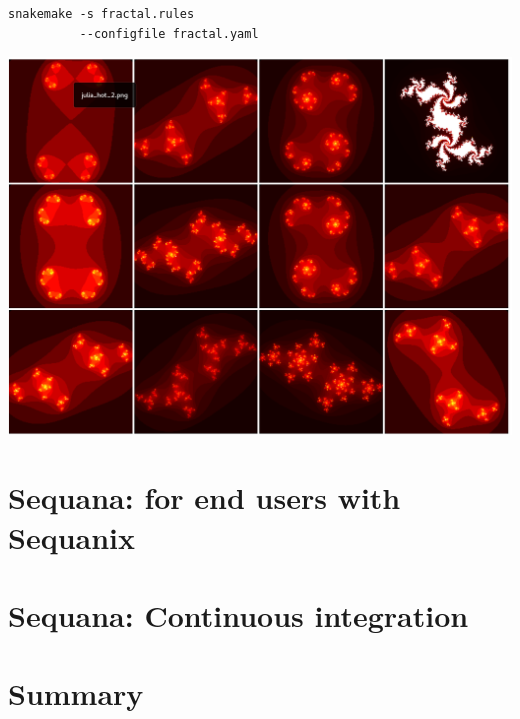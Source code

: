 \documentclass{beamer}
\begin{document}
\begin{frame}[fragile]

\begin{lstlisting}[basicstyle=\ttfamily\large]
snakemake -s fractal.rules 
          --configfile fractal.yaml
 \end{lstlisting}
 
\pause 
 \includegraphics[scale=0.25]{./images/julia_set.png}
\end{frame}




\section{Sequana: for end users with Sequanix}

 

\section{Sequana: Continuous integration}


\section{Summary}
\end{document}
